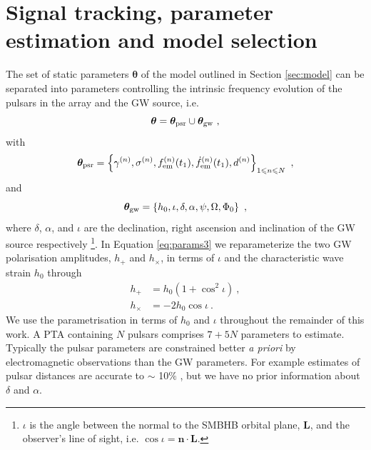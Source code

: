 \documentclass[fleqn,usenatbib,useAMS]{mnras}
\begin{document}
\section{Signal tracking, parameter estimation and model selection} \label{sec:detect}
The set of static parameters $\boldsymbol{\theta}$ of the model outlined in Section \ref{sec:model} can be separated into parameters controlling the intrinsic frequency evolution of the pulsars in the array and the GW source, i.e. 
\begin{equation}
	\boldsymbol{\theta} =  \boldsymbol{\theta}_{\rm psr} \cup \boldsymbol{\theta}_{\rm gw} \ , \label{eq:params1}
\end{equation}
with
\begin{equation}
	\boldsymbol{\theta}_{\rm psr} = \left \{ \gamma^{(n)},\sigma^{(n)}, f_{\rm em}^{(n)}(t_1),\dot{f}_{\rm em}^{(n)}(t_1),d^{(n)}\right\}_{1\leq n \leq N} \ , \label{eq:psrparams}
\end{equation}
and
\begin{equation}
	\boldsymbol{\theta}_{\rm gw} = \left \{h_0, \iota, \delta, \alpha, \psi, \Omega, \Phi_0 \right \} \ ,  \label{eq:params3}
\end{equation}
where $\delta$, $\alpha$, and $\iota$ are the declination, right ascension and inclination of the GW source respectively \footnote{$\iota$ is the angle between the normal to the SMBHB orbital plane, $\boldsymbol{L}$, and the observer's line of sight, i.e. $\cos \iota = \boldsymbol{n} \cdot \boldsymbol{L}$.}. In Equation \eqref{eq:params3} we reparameterize the two GW polarisation amplitudes, $h_{+}$ and $h_{\times}$, in terms of $\iota$ and the characteristic wave strain $h_0$ through 
\begin{align}
	h_+ &= h_0(1 + \cos^2 \iota) 	\label{eq:hphx} \ ,\\
	h_{\times} &= -2h_0\cos \iota 	\label{eq:hphx2} \ .
\end{align}
We use the parametrisation in terms of $h_0$ and $\iota$ throughout the remainder of this work. A PTA containing $N$ pulsars comprises $7 + 5N$ parameters to estimate. Typically the pulsar parameters are constrained better \textit{a priori} by electromagnetic observations than the GW parameters. For example estimates of pulsar distances are accurate to $\sim$ 10$\%$ \citep{Cordes2002astro.ph..7156C, Verbiest2012ApJ...755...39V, Desvignes2016,Yao2017}, but we have no prior information about $\delta$ and $\alpha$. \newline 
\end{document}
